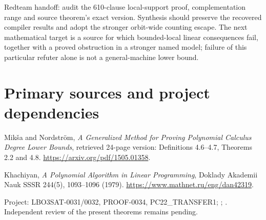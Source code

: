\documentclass[11pt]{article}
\begin{document}
Redteam handoff: audit the 610-clause local-support proof, complementation range and source theorem's exact version. Synthesis should preserve the recovered compiler results and adopt the stronger orbit-wide counting escape. The next mathematical target is a source for which bounded-local linear consequences fail, together with a proved obstruction in a stronger named model; failure of this particular refuter alone is not a general-machine lower bound.

\section*{Primary sources and project dependencies}
Mik\v{s}a and Nordstr\"om, \emph{A Generalized Method for Proving Polynomial Calculus Degree Lower Bounds}, retrieved 24-page version: Definitions 4.6--4.7, Theorems 2.2 and 4.8. \url{https://arxiv.org/pdf/1505.01358}.

Khachiyan, \emph{A Polynomial Algorithm in Linear Programming}, Doklady Akademii Nauk SSSR 244(5), 1093--1096 (1979). \url{https://www.mathnet.ru/eng/dan42319}.

Project: LBO3SAT-0031/0032, PROOF-0034, PC22\_TRANSFER1; ; . Independent review of the present theorems remains pending.
\end{document}
